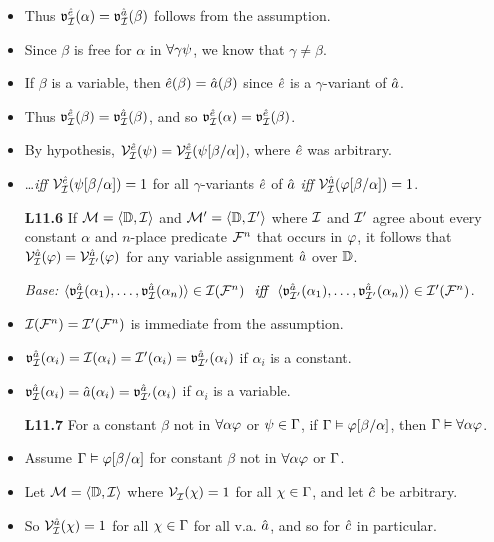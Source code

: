 \documentclass[a4paper, 11pt]{article} %
\begin{document}
\begin{itemize}
    \item Thus $\mathfrak{v}_{\mathcal{I}}^{\hat{e}}(\alpha)=\mathfrak{v}_{\mathcal{I}}^{\hat{a}}(\beta)$ follows from the assumption. 
    \item Since $\beta$ is free for $\alpha$ in $\forall \gamma\psi$, we know that $\gamma\neq\beta$.
    \item If $\beta$ is a variable, then $\hat{e}(\beta)=\hat{a}(\beta)$ since $\hat{e}$ is a $\gamma$-variant of $\hat{a}$.
    \item Thus $\mathfrak{v}_{\mathcal{I}}^{\hat{e}}(\beta)=\mathfrak{v}_{\mathcal{I}}^{\hat{a}}(\beta)$, and so $\mathfrak{v}_{\mathcal{I}}^{\hat{e}}(\alpha)=\mathfrak{v}_{\mathcal{I}}^{\hat{e}}(\beta)$.
    \item By hypothesis, $\mathcal{V}_{\mathcal{I}}^{\hat{e}}(\psi)=\mathcal{V}_{\mathcal{I}}^{\hat{e}}(\psi[\beta/\alpha])$, where $\hat{e}$ was arbitrary.
    \item \ldots\textit{iff} $\mathcal{V}_{\mathcal{I}}^{\hat{e}}(\psi[\beta/\alpha])=1$ for all $\gamma$-variants $\hat{e}$ of $\hat{a}$ \textit{iff} $\mathcal{V}_{\mathcal{I}}^{\hat{a}}(\varphi[\beta/\alpha])=1$.
  \item[\bf L11.6] If $\mathcal{M}=\langle\mathbb{D},\mathcal{I}\rangle$ and $\mathcal{M}'=\langle\mathbb{D},\mathcal{I}'\rangle$ where $\mathcal{I}$ and $\mathcal{I}'$ agree about every constant $\alpha$ and $n$-place predicate $\mathcal{F}^n$ that occurs in $\varphi$, it follows that $\mathcal{V}_{\mathcal{I}}^{\hat{a}}(\varphi)=\mathcal{V}_{\mathcal{I}'}^{\hat{a}}(\varphi)$ for any variable assignment $\hat{a}$ over $\mathbb{D}$.
    \item[\it Base:] $\langle\mathfrak{v}_{\mathcal{I}}^{\hat{a}}(\alpha_1),\ldots,\mathfrak{v}_{\mathcal{I}}^{\hat{a}}(\alpha_n)\rangle\in\mathcal{I}(\mathcal{F}^n) \textit{ ~iff~ } \langle\mathfrak{v}_{\mathcal{I}'}^{\hat{a}}(\alpha_1),\ldots,\mathfrak{v}_{\mathcal{I}'}^{\hat{a}}(\alpha_n)\rangle\in\mathcal{I}'(\mathcal{F}^n)$.
    \item $\mathcal{I}(\mathcal{F}^n)=\mathcal{I}'(\mathcal{F}^n)$ is immediate from the assumption.
    \item $\mathfrak{v}_{\mathcal{I}}^{\hat{a}}(\alpha_i)=\mathcal{I}(\alpha_i)=\mathcal{I}'(\alpha_i)=\mathfrak{v}_{\mathcal{I}'}^{\hat{a}}(\alpha_i)$ if $\alpha_i$ is a constant.
    \item $\mathfrak{v}_{\mathcal{I}}^{\hat{a}}(\alpha_i)=\hat{a}(\alpha_i)=\mathfrak{v}_{\mathcal{I}'}^{\hat{a}}(\alpha_i)$ if $\alpha_i$ is a variable.
  \item[\bf L11.7] For a constant $\beta$ not in $\forall \alpha\varphi$ or $\psi\in\Gamma$, if $\Gamma \vDash \varphi[\beta/\alpha]$, then $\Gamma \vDash \forall \alpha\varphi$.
      \item Assume $\Gamma \vDash \varphi[\beta/\alpha]$ for constant $\beta$ not in $\forall \alpha\varphi$ or $\Gamma$.
      \item Let $\mathcal{M} = \langle\mathbb{D}, \mathcal{I}\rangle$ where $\mathcal{V}_{\mathcal{I}}^{}(\chi) = 1$ for all $\chi\in\Gamma$, and let $\hat{c}$ be arbitrary.
      \item So $\mathcal{V}_{\mathcal{I}}^{\hat{a}}(\chi) = 1$ for all $\chi\in\Gamma$ for all v.a. $\hat{a}$, and so for $\hat{c}$ in particular.

\end{itemize}
\end{document}
